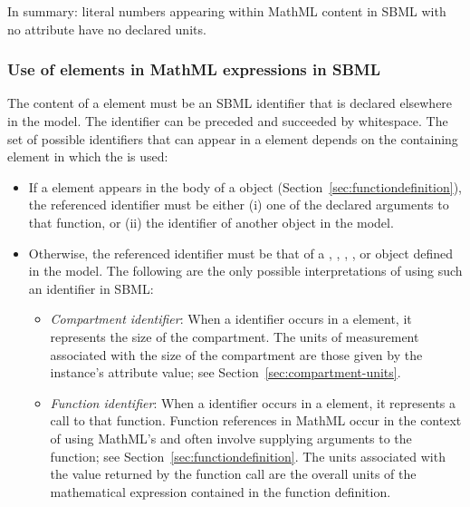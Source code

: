 In summary: literal numbers appearing within MathML content in
SBML with no  attribute have no declared units.

\subsubsection{Use of  elements in MathML expressions in SBML}
\label{sec:ci-token}

The content of a  element must be an SBML identifier
that is declared elsewhere in the model.  The identifier can be
preceded and succeeded by whitespace. The set of possible
identifiers that can appear in a  element depends on the
containing element in which the  is used:
\begin{itemize}
  
\item If a  element appears in the body of a
  \FunctionDefinition object
  (Section~\ref{sec:functiondefinition}), the referenced
  identifier must be either (i) one of the declared arguments to
  that function, or (ii) the identifier of another
  \FunctionDefinition object in the model.
  
\item Otherwise, the referenced identifier must be that of a
  \Compartment, \FunctionDefinition, \Parameter, \Reaction,
  \Species or \SpeciesReference object defined in the model.  The
  following are the only possible interpretations of using such an
  identifier in SBML:
  \begin{itemize}

  \item \emph{Compartment identifier}: When a \Compartment
    identifier occurs in a  element, it represents the
    size of the compartment.  The units of measurement
      associated with the size of the compartment are those given
      by the \Compartment instance's  attribute
      value; see Section~\ref{sec:compartment-units}.
    
  \item \emph{Function identifier}: When a \FunctionDefinition
    identifier occurs in a  element, it represents a
    call to that function.  Function references in MathML occur in
    the context of using MathML's  and often involve
    supplying arguments to the function; see
    Section~\ref{sec:functiondefinition}.  The units
      associated with the value returned by the function
      call are the overall units of the mathematical expression
    contained in the function definition.
    

\end{itemize}
\end{itemize}
